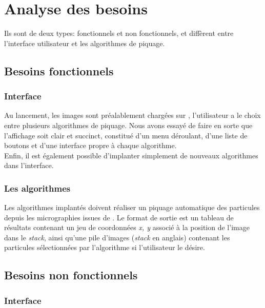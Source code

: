 \section{Analyse des besoins}

\noindent
Ils sont de deux types: fonctionnels et non fonctionnels, et diffèrent entre l'interface utilisateur et les algorithmes de piquage.

\subsection{Besoins fonctionnels}

\subsubsection{Interface}

\noindent
Au lancement, les images sont préalablement chargées sur \imj , l'utilisateur a le choix entre plusieurs algorithmes de piquage. %
Nous avons essayé de faire en sorte que l'affichage soit clair et succinct, constitué d'un menu déroulant, d'une liste de boutons et d'une interface propre à chaque algorithme.\\
Enfin, il est également possible d'implanter simplement de nouveaux algorithmes dans l'interface. %

\subsubsection{Les algorithmes}

Les algorithmes implantés doivent réaliser un piquage automatique des particules depuis les micrographies issues de \me. Le format de sortie est un tableau de résultats contenant un jeu de coordonnées \emph{x, y} associé à la position de l'image dans le \textit{stack}, ainsi qu'une pile d'images (\textit{stack} en anglais) contenant les particules sélectionnées par l'algorithme si l'utilisateur le désire.

\subsection{Besoins non fonctionnels}

\subsubsection{Interface}

